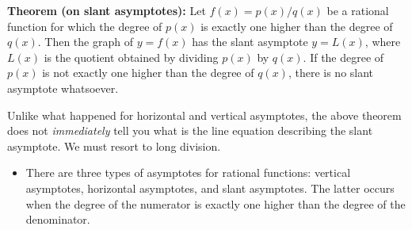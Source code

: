 \documentclass{ximera}
\begin{document}
\begin{callout}
  {\bf Theorem (on slant asymptotes):} Let $f(x) = p(x)/q(x)$ be a rational function for which the degree of $p(x)$ is exactly one higher than the degree of $q(x)$. Then the graph of $y=f(x)$ has the slant asymptote $y=L(x)$, where $L(x)$ is the quotient obtained by dividing $p(x)$ by $q(x)$. If the degree of $p(x)$ is not exactly one higher than the degree of $q(x)$, there is no slant asymptote whatsoever.
\end{callout}

  Unlike what happened for horizontal and vertical asymptotes, the above theorem does not \emph{immediately} tell you what is the line equation describing the slant asymptote. We must resort to long division.


\begin{summary}\begin{itemize}
\item There are three types of asymptotes for rational functions: vertical asymptotes, horizontal asymptotes, and slant asymptotes. The latter occurs when the degree of the numerator is exactly one higher than the degree of the denominator.
\end{itemize}\end{summary}
\end{document}
